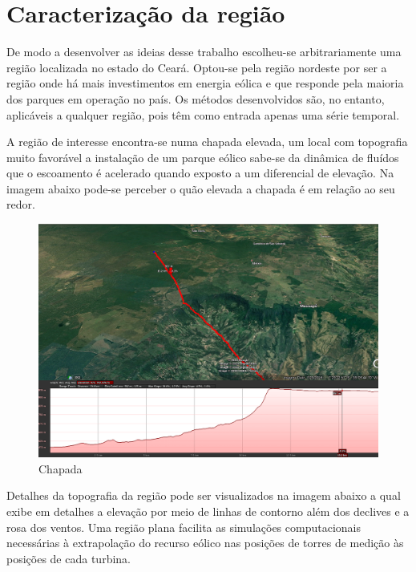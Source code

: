 \documentclass[
	12pt,				%
	openright,			%
	oneside,			%
	a4paper,			%
	english,			%
	french,				%
	spanish,			%
	brazil				%
	]{abntex2}
\begin{document}
\chapter{Caracterização da região}

De modo a desenvolver as ideias desse trabalho escolheu-se arbitrariamente uma região localizada no estado do Ceará. Optou-se pela região nordeste por ser a região onde há mais investimentos em energia eólica e que responde pela maioria dos parques em operação no país. Os métodos desenvolvidos são, no entanto, aplicáveis a qualquer região, pois têm como entrada apenas uma série temporal.

A região de interesse encontra-se numa chapada elevada, um local com topografia muito favorável a instalação de um parque eólico sabe-se da dinâmica de fluídos que o escoamento é acelerado quando exposto a um diferencial de elevação. Na imagem abaixo pode-se perceber o quão elevada a chapada é em relação ao seu redor.

\begin{figure}[h]
    \centering
	\includegraphics[width=\textwidth]{elevation2}
	\caption{Chapada}
\end{figure}
\FloatBarrier

Detalhes da topografia da região pode ser visualizados na imagem abaixo a qual exibe em detalhes a elevação por meio de linhas de contorno além dos declives e a rosa dos ventos. Uma região plana facilita as simulações computacionais necessárias à extrapolação do recurso eólico nas posições de torres de medição às posições de cada turbina. 
\end{document}
